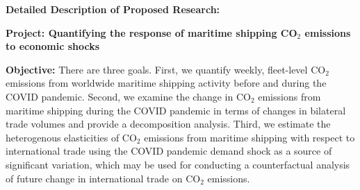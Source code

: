 \documentclass[hidelinks, 12pt,letterpaper]{article}
\begin{document}




\begin{center}
\textbf{Detailed Description of Proposed Research: }\vspace{-0.25cm}
\end{center}

\noindent \textbf{Project: Quantifying the response of maritime shipping CO$_2$ emissions to economic shocks}
\smallskip

\noindent \textbf{Objective:} There are three goals. First, we quantify weekly, fleet-level CO$_2$ emissions from worldwide maritime shipping activity before and during the COVID pandemic.
Second, we examine the change in CO$_2$ emissions from maritime shipping during the COVID pandemic in terms of changes in bilateral trade volumes and provide a decomposition analysis. 
Third, we estimate the heterogenous elasticities of CO$_2$ emissions from maritime shipping with respect to international trade using the COVID pandemic demand shock as a source of significant variation, which may be used for conducting a counterfactual analysis of future change in international trade on CO$_2$ emissions.
\smallskip
\end{document}
